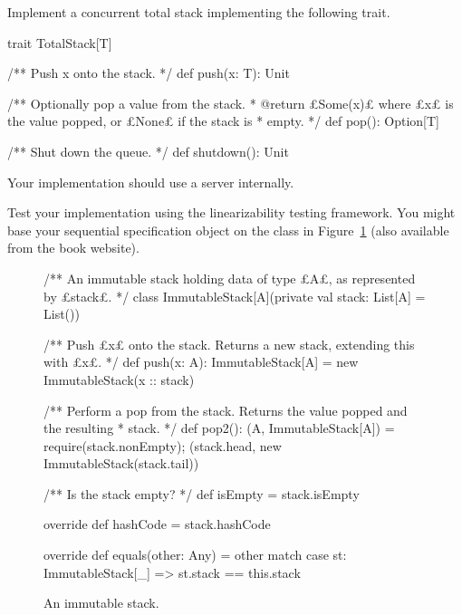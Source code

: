 \begin{questionS}
Implement a concurrent total stack implementing the following trait.
%
\begin{scala}
trait TotalStack[T]{
  /** Push x onto the stack. */
  def push(x: T): Unit

  /** Optionally pop a value from the stack.
    * @return £Some(x)£ where £x£ is the value popped, or £None£ if the stack is
    * empty. */
  def pop(): Option[T]

  /** Shut down the queue. */
  def shutdown(): Unit
}
\end{scala}
% 
% 
Your implementation should use a server internally.

Test your implementation using the linearizability testing framework.  You
might base your sequential specification object on the class in
Figure~\ref{fig:immutable-stack} (also available from the book website).
%
\begin{figure}
\begin{scala}
/** An immutable stack holding data of type £A£, as represented by £stack£. */
class ImmutableStack[A](private val stack: List[A] = List()){
  /** Push £x£ onto the stack.  Returns a new stack, extending this with £x£. */
  def push(x: A): ImmutableStack[A] = new ImmutableStack(x :: stack)

  /** Perform a pop from the stack.  Returns the value popped and the resulting
    * stack. */
  def pop2(): (A, ImmutableStack[A]) = {
    require(stack.nonEmpty); (stack.head, new ImmutableStack(stack.tail))
  }

  /** Is the stack empty? */
  def isEmpty = stack.isEmpty

  override def hashCode = stack.hashCode

  override def equals(other: Any) = other match{
    case st: ImmutableStack[_] => st.stack == this.stack
  }
}
\end{scala}
\caption{An immutable stack.}
\label{fig:immutable-stack}
\end{figure}
\end{questionS}


